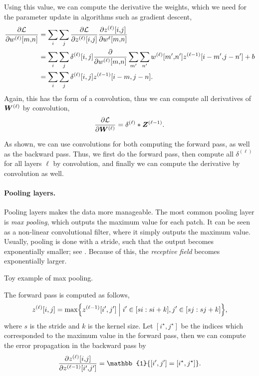 Using this value, we can compute the derivative \wrt the weights, which we need for the parameter
update in algorithms such as gradient descent,
\begin{align*}
    \pdv{\mathcal{L}}{w^{(\ell)}[m{,}n]} & = \sum_{i} \sum_{j} \pdv{\mathcal{L}}{z^{(\ell)}[i{,}j]} \pdv{z^{(\ell)}[i{,}j]}{w^{\ell}[m{,}n]}                                        \\
                                         & = \sum_{i} \sum_{j} \delta^{(\ell)}[i,j] \pdv*{\sum_{m'} \sum_{n'} w^{(\ell)}[m'{,}n'] z^{(\ell-1)}[i-m'{,}j-n'] + b}{w^{(\ell)}[m{,}n]} \\
                                         & = \sum_{i} \sum_{j} \delta^{(\ell)}[i,j] z^{(\ell-1)}[i-m,j-n].
\end{align*}
Again, this has the form of a convolution, thus we can compute all derivatives of $\bm{W}^{(\ell)}$ by convolution, \[
    \pdv{\mathcal{L}}{\bm{W}^{(\ell)}} = \delta^{(\ell)} * \bm{Z}^{(\ell-1)}.
\]

As shown, we can use convolutions for both computing the forward pass, as well as the backward
pass. Thus, we first do the forward pass, then compute all $\delta^{(\ell)}$ for all layers $\ell$
by convolution, and finally we can compute the derivative by convolution as well.

\paragraph{Pooling layers.}

Pooling layers makes the data more manageable. The most common pooling layer is \textit{max
    pooling}, which outputs the maximum value for each patch. It can be seen as a non-linear
convolutional filter, where it simply outputs the maximum value. Usually, pooling is done with a
stride, such that the output becomes exponentially smaller; see . Because of
this, the \textit{receptive field} becomes exponentially larger.

\begin{marginfigure}
    \centering
    \caption{Toy example of max pooling.}
    \label{fig:max-pooling}
\end{marginfigure}

The forward pass is computed as follows,
\[
    z^{(\ell)}[i,j] = \max \lft\{ z^{(\ell-1)}[i',j'] \;\middle|\; i' \in [si:si+k], j' \in [sj:sj+k] \rgt\},
\]
where $s$ is the stride and $k$ is the kernel size. Let $[i^\star,j^\star]$ be the indices which
corresponded to the maximum value in the forward pass, then we can compute the error propagation in
the backward pass by \[
    \pdv{z^{(\ell)}[i{,}j]}{z^{(\ell-1)}[i'{,}j']} = \mathbb{1}\{ [i',j'] = [i^\star,j^\star] \}.
\]

